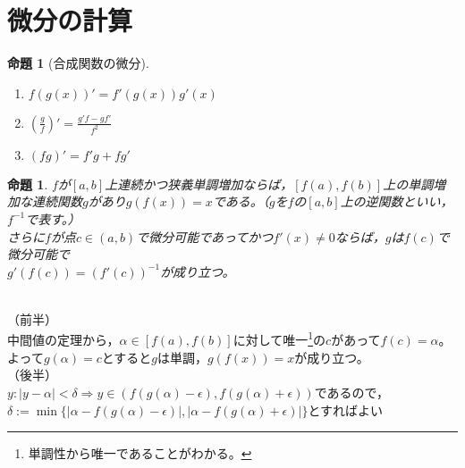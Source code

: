 \documentclass[dvipdfmx,a4j,10pt]{jsarticle}
\makeatletter
\theoremstyle{mystyle1}
\newtheorem{prop}[dfn]{命題}
\theoremstyle{mystyle2}
\renewenvironment{proof}[1][\proofname]{\par
  \pushQED{\qed}%
  \normalfont
  \topsep6\p@\@plus6\p@ \trivlist
  \item[\hskip\labelsep{\bfseries\sffamily #1}]\ignorespaces
}{%
  \popQED\endtrivlist\@endpefalse
}
\renewcommand\proofname{証明}
\makeatother
\begin{document}
\newpage

\section{微分の計算}

\begin{framed}
    \begin{prop}[合成関数の微分]\label{prop7.1}　
        \begin{enumerate}
        \item $f(g(x))'=f'(g(x))g'(x)$
        \item $\displaystyle \left(\frac{g}{f}\right)'=\frac{g'f-gf'}{f^2}$
        \item $(fg)'=f'g+fg'$
        \end{enumerate}
    \end{prop}
\end{framed}

\begin{framed}
    \begin{prop}\label{prop7.2}
    $f$が$[a,b]$上連続かつ狭義単調増加ならば，$[f(a),f(b)]$上の単調増加な連続関数$g$があり$g(f(x))=x$である。（$g$を$f$の$[a,b]$上の逆関数といい，$f^{-1}$で表す。）\\
    さらに$f$が点$c\in (a,b)$で微分可能であってかつ$f'(x)\neq0$ならば，$g$は$f(c)$で微分可能で\\$g'(f(c))=(f'(c))^{-1}$が成り立つ。
    \end{prop}
\end{framed}

\begin{proof}[命題\ref{prop7.2}の証明]\
    \\
    （前半）\\
    中間値の定理から，$\alpha\in [f(a),f(b)]$に対して唯一\footnote{単調性から唯一であることがわかる。}の$c$があって$f(c)=\alpha$。よって$g(\alpha)=c$とすると$g$は単調，$g(f(x))=x$が成り立つ。\\
    （後半）\\
    $y:|y-\alpha|<\delta\Rightarrow y\in (f(g(\alpha)-\epsilon),f(g(\alpha)+\epsilon))$であるので，$\delta :=\min\{|\alpha-f(g(\alpha)-\epsilon)|,|\alpha-f(g(\alpha)+\epsilon)|\}$とすればよい
\end{proof}
\end{document}
